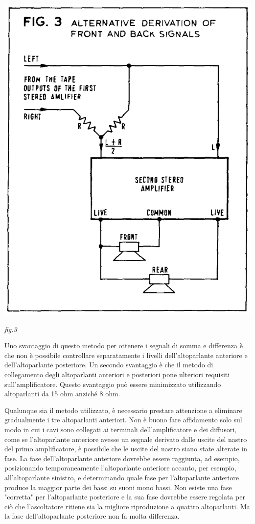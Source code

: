 \documentclass[11pt]{article}
\begin{document}
\begin{multicols*}{2}
\begin{center}
\includegraphics[scale=0.4]{images/fig_03.png}


{\scriptsize \emph{fig.3}}
\end{center}

Uno svantaggio di questo metodo per ottenere i segnali di somma e differenza è che non è possibile controllare separatamente i livelli dell'altoparlante anteriore e dell'altoparlante posteriore. Un secondo svantaggio è che il metodo di collegamento degli altoparlanti anteriori e posteriori pone ulteriori requisiti sull'amplificatore. Questo svantaggio può essere minimizzato utilizzando altoparlanti da 15 ohm anziché 8 ohm.

Qualunque sia il metodo utilizzato, è necessario prestare attenzione a eliminare gradualmente i tre altoparlanti anteriori. Non è buono fare affidamento solo sul modo in cui i cavi sono collegati ai terminali dell'amplificatore e dei diffusori, come se l'altoparlante anteriore avesse un segnale derivato dalle uscite del nastro del primo amplificatore, è possibile che le uscite del nastro siano state alterate in fase. La fase dell'altoparlante anteriore dovrebbe essere raggiunta, ad esempio, posizionando temporaneamente l'altoparlante anteriore accanto, per esempio, all'altoparlante sinistro, e determinando quale fase per l'altoparlante anteriore produce la maggior parte dei bassi su suoni mono bassi. Non esiste una fase "corretta" per l'altoparlante posteriore e la sua fase dovrebbe essere regolata per ciò che l'ascoltatore ritiene sia la migliore riproduzione a quattro altoparlanti.
Ma la fase dell'altoparlante posteriore non fa molta differenza.


\end{multicols*}
\end{document}

